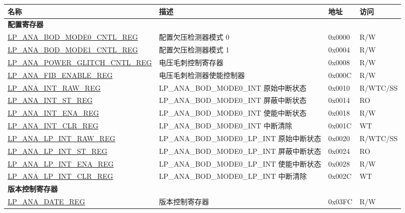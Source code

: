 \begin{longtable}{ | l | l | l | l | }
\hline\rowcolor{lightgray}
\textbf{名称} & \textbf{描述} &  \textbf{地址} & \textbf{访问} \\ \hline
\endhead
\multicolumn{4}{|l|}{\textbf{配置寄存器}} \\ \hline
\hyperref[regdesc:LPANABODMODE0CNTLREG]{LP\_ANA\_BOD\_MODE0\_CNTL\_REG} & 配置欠压检测器模式 0 & 0x0000 & R/W \\ \hline\hyperref[regdesc:LPANABODMODE1CNTLREG]{LP\_ANA\_BOD\_MODE1\_CNTL\_REG} &  配置欠压检测器模式 1 & 0x0004 & R/W \\  \hline\hyperref[regdesc:LPANAPOWERGLITCHCNTLREG]{LP\_ANA\_POWER\_GLITCH\_CNTL\_REG} & 电压毛刺控制寄存器 & 0x0008 & R/W \\  \hline\hyperref[regdesc:LPANAFIBENABLEREG]{LP\_ANA\_FIB\_ENABLE\_REG} & 电压毛刺检测器使能控制器 & 0x000C & R/W  \\ \hline\hyperref[regdesc:LPANAINTRAWREG]{LP\_ANA\_INT\_RAW\_REG} &  LP\_ANA\_BOD\_MODE0\_INT 原始中断状态 & 0x0010 & R/WTC/SS \\ \hline\hyperref[regdesc:LPANAINTSTREG]{LP\_ANA\_INT\_ST\_REG} & LP\_ANA\_BOD\_MODE0\_INT 屏蔽中断状态 & 0x0014 & RO \\ \hline\hyperref[regdesc:LPANAINTENAREG]{LP\_ANA\_INT\_ENA\_REG} & LP\_ANA\_BOD\_MODE0\_INT 使能中断状态 & 0x0018 & R/W \\ \hline\hyperref[regdesc:LPANAINTCLRREG]{LP\_ANA\_INT\_CLR\_REG} & LP\_ANA\_BOD\_MODE0\_INT 中断清除 & 0x001C & WT \\ \hline\hyperref[regdesc:LPANALPINTRAWREG]{LP\_ANA\_LP\_INT\_RAW\_REG} & LP\_ANA\_BOD\_MODE0\_LP\_INT 原始中断状态 & 0x0020 & R/WTC/SS \\ \hline\hyperref[regdesc:LPANALPINTSTREG]{LP\_ANA\_LP\_INT\_ST\_REG} & LP\_ANA\_BOD\_MODE0\_LP\_INT 屏蔽中断状态 & 0x0024 & RO \\ \hline\hyperref[regdesc:LPANALPINTENAREG]{LP\_ANA\_LP\_INT\_ENA\_REG} & LP\_ANA\_BOD\_MODE0\_LP\_INT 使能中断状态 & 0x0028 & R/W \\ \hline\hyperref[regdesc:LPANALPINTCLRREG]{LP\_ANA\_LP\_INT\_CLR\_REG} & LP\_ANA\_BOD\_MODE0\_LP\_INT  中断清除 & 0x002C & WT \\ \hline
\multicolumn{4}{|l|}{\textbf{版本控制寄存器}} \\ \hline
\hyperref[regdesc:LPANADATEREG]{LP\_ANA\_DATE\_REG} & 版本控制寄存器 & 0x03FC & R/W \\ \hline\end{longtable}
